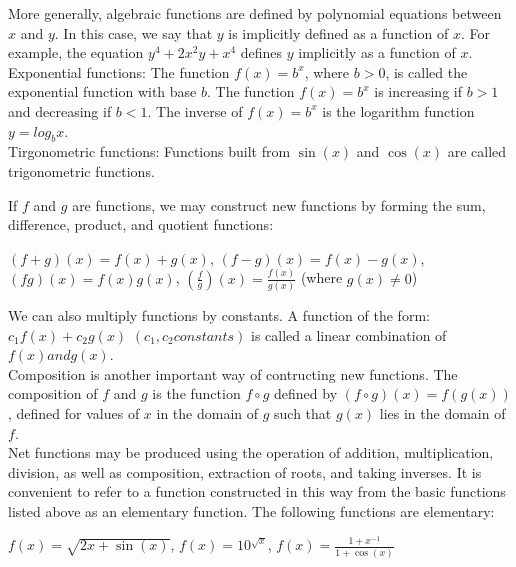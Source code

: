 \documentclass{article}
\begin{document}
More generally, algebraic functions are defined by polynomial equations between $x$ and $y$. In this case, we say that $y$ is implicitly defined as a function of $x$. For example, the equation $y^4 + 2x^{2}y + x^4$ defines $y$ implicitly as a function of $x$.\\

Exponential functions: The function $f(x) = b^x$, where $b > 0$, is called the exponential function with base $b$. The function $f(x) = b^x$ is increasing if $b > 1$ and decreasing if $b < 1$. The inverse of $f(x) = b^x$ is the logarithm function $y = log_{b}x$.\\

Tirgonometric functions: Functions built from $\sin(x)$ and $\cos(x)$ are called trigonometric functions.

If $f$ and $g$ are functions, we may construct new functions by forming the sum, difference, product, and quotient functions:\\
\begin{center} $(f + g)(x) = f(x) + g(x)$, $(f - g)(x) = f(x) - g(x)$, $(fg)(x) = f(x)g(x)$, $(\frac{f}{g})(x) = \frac{f(x)}{g(x)}$ (where $g(x) \neq 0$)\end{center}

We can also multiply functions by constants. A function of the form: $c_1f(x) + c_2g(x)$ $(c_1, c_2 constants)$ is called a linear combination of $f(x) and g(x)$.\\

Composition is another important way of contructing new functions. The composition of $f$ and $g$ is the function $f \circ g$ defined by $(f \circ g)(x) = f(g(x))$, defined for values of $x$ in the domain of $g$ such that $g(x)$ lies in the domain of $f$.\\

Net functions may be produced using the operation of addition, multiplication, division, as well as composition, extraction of roots, and taking inverses. It is convenient to refer to a function constructed in this way from the basic functions listed above as an elementary function. The following functions are elementary:\\
\begin{center} $f(x) = \sqrt{2x + \sin(x)}$, $f(x) = 10^{\sqrt{x}}$, $f(x) = \frac{1 + x^{-1}}{1 + \cos(x)}$\end{center}
\end{document}
